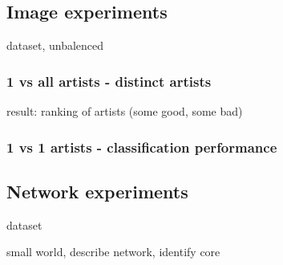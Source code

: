 \subsection{Image experiments}
dataset, unbalenced
\subsubsection{1 vs all artists - distinct artists}
result: ranking of artists (some good, some bad)

\subsubsection{1 vs 1 artists - classification performance}

\subsection{Network experiments}
dataset

small world, describe network, identify core